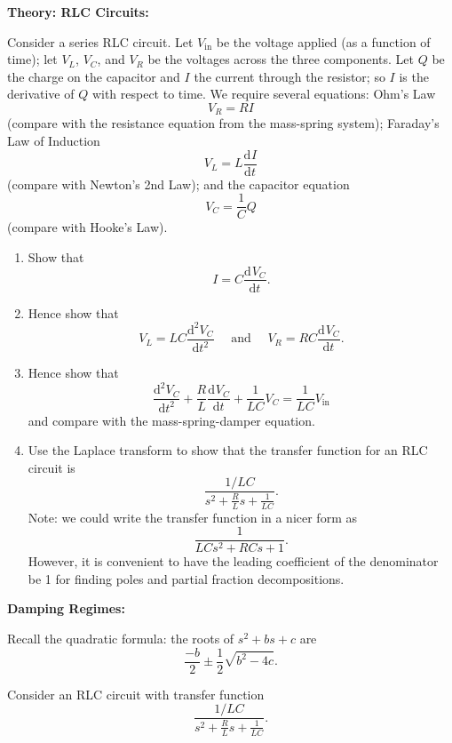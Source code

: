 \documentclass{article}
\newcommand{\deriv}[3][]{\frac{\mathrm{d}^{#1}#2}{\mathrm{d}#3^{#1}}}
\begin{document}
\clearpage










\textbf{Theory: RLC Circuits:}

\bigskip

Consider a series RLC circuit. Let $V_\mathrm{in}$ be the voltage applied (as a function of time); let $V_L$, $V_C$, and $V_R$ be the voltages across the three components. Let $Q$ be the charge on the capacitor and $I$ the current through the resistor; so $I$ is the derivative of $Q$ with respect to time. We require several equations: Ohm's Law
\[V_R=RI\]
(compare with the resistance equation from the mass-spring system); Faraday's Law of Induction
\[V_L=L\deriv{I}{t}\]
(compare with Newton's 2nd Law); and the capacitor equation
\[V_C=\frac{1}{C}Q\]
(compare with Hooke's Law).

\begin{enumerate}
	\item Show that
		\[I=C\deriv{V_C}{t}.\]
	\item Hence show that
		\[V_L=LC\deriv[2]{V_C}{t}\quad\mbox{ and }\quad V_R=RC\deriv{V_C}{t}.\]
	\item Hence show that
		\[\deriv[2]{V_C}{t}+\frac{R}{L}\deriv{V_C}{t}+\frac{1}{LC}V_C=\frac{1}{LC}V_\mathrm{in}\]
		and compare with the mass-spring-damper equation.
	\item Use the Laplace transform to show that the transfer function for an RLC circuit is
		\[\frac{1/LC}{s^2+\frac{R}{L}s+\frac{1}{LC}}.\]
		Note: we could write the transfer function in a nicer form as
		\[\frac{1}{LCs^2 + RCs + 1}.\]
		However, it is convenient to have the leading coefficient of the denominator be 1 for finding poles and partial fraction decompositions.
\end{enumerate}








\clearpage






\textbf{Damping Regimes:}\bigskip



Recall the quadratic formula: the roots of $s^2+bs+c$ are
\[\frac{-b}{2}\pm\frac{1}{2}\sqrt{b^2-4c}.\]

Consider an RLC circuit with transfer function
\[\frac{1/LC}{s^2+\frac{R}{L}s+\frac{1}{LC}}.\]
\end{document}
